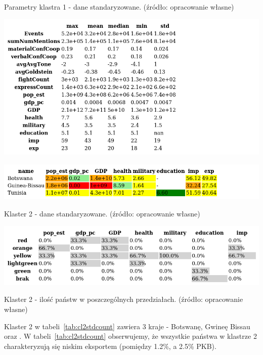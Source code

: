 \documentclass[11pt]{report}
\begin{document}
    \begin{table}[!htp]
        \centering
        \caption{Parametry klastra 1 - dane standaryzowane. (źródło: opracowanie własne)}
        \label{tab:cl1std_desc}
        \includegraphics[width=\linewidth]{tables/CLUST/desc/clust1std_desc.png}
    \end{table}

    \begin{table}[!htp]
        \centering
        \includegraphics[width=\linewidth]{tables/CLUST/cluster2stdkmeans.png}
        \caption{Klaster 2 - dane standaryzowane. (źródło: opracowanie własne)}
        \label{tab:cl2std}
    \end{table}

    \begin{table}[!htp]
        \centering
        \includegraphics[width=\linewidth]{tables/CLUST/cluster2stdkmeanscount.png}
        \caption{Klaster 2 - ilość państw w poszczególnych przedziałach. (źródło: opracowanie własne)}
        \label{tab:cl2stdcount}
    \end{table}

    Klaster 2 w tabeli~\ref{tab:cl2stdcount} zawiera 3 kraje - Botswanę, Gwineę Bissau oraz .
    W tabeli~\ref{tab:cl2stdcount} obserwujemy, że wszystkie państwa w klastrze 2 charakteryzują się niskim eksportem (pomiędzy 1.2\%, a 2.5\% PKB).
\end{document}
